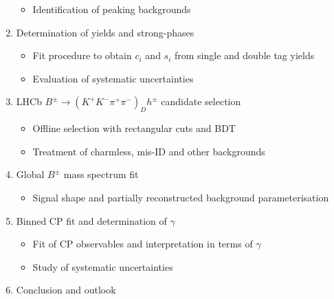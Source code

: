 \documentclass[12pt, a4paper, notitlepage, onecolumn]{article}
\begin{document}
\begin{enumerate}
\begin{itemize}
    \item{Identification of peaking backgrounds}
  \end{itemize}
  \item{Determination of yields and strong-phases}
  \begin{itemize}
    \item{Fit procedure to obtain $c_i$ and $s_i$ from single and double tag yields}
    \item{Evaluation of systematic uncertainties}
  \end{itemize}
  \item{LHCb $B^\pm\to(K^+K^-\pi^+\pi^-)_Dh^\pm$ candidate selection}
  \begin{itemize}
    \item{Offline selection with rectangular cuts and BDT}
    \item{Treatment of charmless, mis-ID and other backgrounds}
  \end{itemize}
  \item{Global $B^\pm$ mass spectrum fit}
  \begin{itemize}
    \item{Signal shape and partially reconstructed background parameterisation}
  \end{itemize}
  \item{Binned CP fit and determination of $\gamma$}
  \begin{itemize}
    \item{Fit of CP observables and interpretation in terms of $\gamma$}
    \item{Study of systematic uncertainties}
  \end{itemize}
  \item{Conclusion and outlook}
\end{enumerate}
\end{document}
